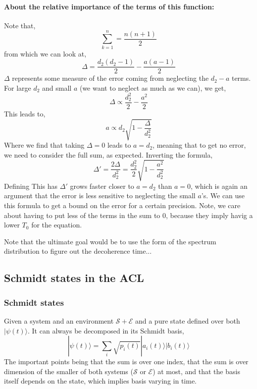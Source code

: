 \documentclass{article}
\begin{document}
\paragraph{About the relative importance of the terms of this function: }Note that,
\begin{equation}
    \sum^n_{k=1}=\frac{n(n+1)}{2}
\end{equation}
from which we can look at,
\begin{equation}
    \Delta=\frac{d_2(d_2-1)}{2}-\frac{a(a-1)}{2}
\end{equation}
$\Delta$ represents some measure of the error coming from neglecting the $d_2-a$ terms. 
For large $d_2$ and small $a$ (we want to neglect as much as we can), we get,
\begin{equation}
    \Delta\propto \frac{d^2_2}{2}-\frac{a^2}{2}
\end{equation}
This leads to,
\begin{equation}
    a\propto d_2\sqrt{1-\frac{\Delta}{d_2^2}}
\end{equation}
Where we find that taking $\Delta=0$ leads to $a=d_2$, meaning that to get no error, we need to consider the full sum, as expected.
Inverting the formula,
\begin{equation}
    \Delta'=\frac{2\Delta}{d_2^2}=\frac{d_2^2}{2}\sqrt{1-\frac{a^2}{d_2^2}} 
\end{equation}
Defining 
This has $\Delta'$ grows faster closer to $a=d_2$ than $a=0$, which is again an argument that the error is less sensitive to neglecting the small $a$'s.
We can use this formula to get a bound on the error for a certain precision. 
Note, we care about having to put less of the terms in the sum to 0, because they imply havig a lower $T_0$ for the equation. 






Note that the ultimate goal would be to use the form of the spectrum distribution to figure out the decoherence time... 

\subsection{Schmidt states in the ACL}

\subsubsection{Schmidt states}

Given a system and an environment $\mathcal{S} + \mathcal{E}$ and a pure state defined over both $|\psi(t)\rangle$. It can always be decomposed in its Schmidt basis,
\begin{equation}
    |\psi(t)\rangle = \sum_i \sqrt{p_i(t)}|a_i(t)\rangle|b_i(t)\rangle
\end{equation}
The important points being that the sum is over one index, that the sum is over dimension of the smaller of both systems ($\mathcal{S}$ or $\mathcal{E}$) at most, and that the basis itself depends on the state, which implies basis varying in time.
\end{document}
